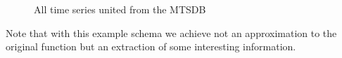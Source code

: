 \begin{figure}[tp]
  \centering
  
  \caption{All time series united from the MTSDB}
  \label{fig:exemple:4mrdtot}
\end{figure}

Note that with this  example schema we achieve not an
approximation to the original function but an extraction of some
interesting information.




